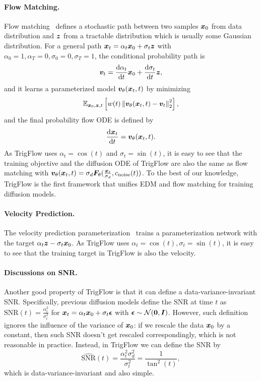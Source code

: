 \paragraph{Flow Matching.}
Flow matching~\citep{lipman2022flowmatching,rectified_flow,albergo2023stochastic_interpolants,kornilov2024optimal} defines a stochastic path between two samples ${\bm{x}}_0$ from data distribution and ${\bm{z}}$ from a tractable distribution which is usually some Gaussian distribution. For a general path ${\bm{x}}_t = \alpha_t {\bm{x}}_0 + \sigma_t {\bm{z}}$ with $\alpha_0 = 1, \alpha_T = 0, \sigma_0 = 0, \sigma_T = 1$, the conditional probability path is
\begin{equation}
   {\bm{v}}_t  = \frac{\mathrm{d} \alpha_t }{\mathrm{d} t} {\bm{x}}_0 + \frac{\mathrm{d} \sigma_t}{\mathrm{d} t} {\bm{z}},
\end{equation}
and it learns a parameterized model ${\bm{v}}_\theta({\bm{x}}_t,t)$ by minimizing
\begin{equation}
    \mathbb{E}_{{\bm{x}}_0,{\bm{z}},t}\left[w(t)\left\|
        {\bm{v}}_\theta({\bm{x}}_t,t) - {\bm{v}}_t 
    \right\|_2^2\right],
\end{equation}
and the final probability flow ODE is defined by
\begin{equation}
    \frac{\mathrm{d} {\bm{x}}_t}{\mathrm{d} t} = {\bm{v}}_\theta({\bm{x}}_t,t).
\end{equation}
As TrigFlow uses $\alpha_t = \cos(t)$ and $\sigma_t = \sin(t)$, it is easy to see that the training objective and the diffusion ODE of TrigFlow are also the same as flow matching with ${\bm{v}}_\theta({\bm{x}}_t,t) = \sigma_d {\bm{F}}_\theta(\frac{{\bm{x}}_t}{\sigma_d}, c_{\text{noise}}(t))$. To the best of our knowledge, TrigFlow is the first framework that unifies EDM and flow matching for training diffusion models.

\paragraph{Velocity Prediction.}
The velocity prediction parameterization~\citep{salimans2022progressive} trains a parameterization network with the target $\alpha_t {\bm{z}} - \sigma_t {\bm{x}}_0$. As TrigFlow uses $\alpha_t = \cos(t), \sigma_t = \sin(t)$, it is easy to see that the training target in TrigFlow is also the velocity.

\paragraph{Discussions on SNR.}
Another good property of TrigFlow is that it can define a data-variance-invariant SNR. Specifically, previous diffusion models define the SNR at time $t$ as $\text{SNR}(t) = \frac{\alpha^2_t}{\sigma_t^2}$ for ${\bm{x}}_t = \alpha_t {\bm{x}}_0 + \sigma_t \bm{\epsilon}$ with $\bm{\epsilon}\sim{\mathcal{N}}({\bm{0}}, {\bm{I}})$. However, such definition ignores the influence of the variance of ${\bm{x}}_0$: if we rescale the data ${\bm{x}}_0$ by a constant, then such SNR doesn't get rescaled correspondingly, which is not reasonable in practice. Instead, in TrigFlow we can define the SNR by
\begin{equation}
    \hat{\text{SNR}}(t) = \frac{\alpha_t^2\sigma_d^2}{\sigma_t^2} = \frac{1}{\tan^2(t)},
\end{equation}
which is data-variance-invariant and also simple.





